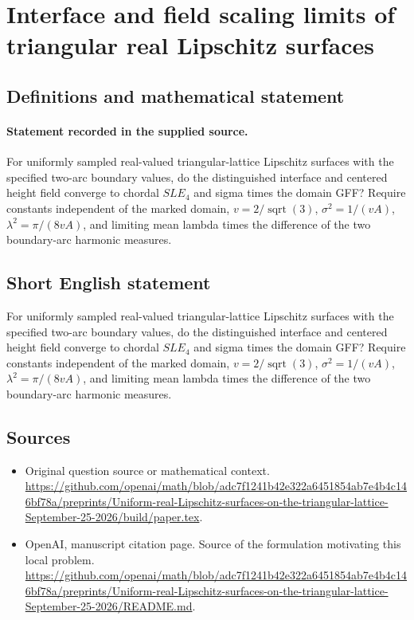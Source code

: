 \documentclass[11pt]{article}
\begin{document}
\section*{Interface and field scaling limits of triangular real Lipschitz surfaces}\label{30007386}
\subsection{Definitions and mathematical statement}
\paragraph{Statement recorded in the supplied source.}
For uniformly sampled real-valued triangular-lattice Lipschitz surfaces with the specified two-arc boundary values, do the distinguished interface and centered height field converge to chordal $SLE_4$ and sigma times the domain GFF? Require constants independent of the marked domain, $v=2/\operatorname{sqrt}(3)$, $\sigma ^2=1/(vA)$, $\lambda ^2=\pi /(8vA)$, and limiting mean lambda times the difference of the two boundary-arc harmonic measures.
\subsection{Short English statement}
For uniformly sampled real-valued triangular-lattice Lipschitz surfaces with the specified two-arc boundary values, do the distinguished interface and centered height field converge to chordal $SLE_4$ and sigma times the domain GFF? Require constants independent of the marked domain, $v=2/\operatorname{sqrt}(3)$, $\sigma ^2=1/(vA)$, $\lambda ^2=\pi /(8vA)$, and limiting mean lambda times the difference of the two boundary-arc harmonic measures.
\subsection{Sources}
\begin{itemize}
\item[S1] Original question source or mathematical context.
\url{https://github.com/openai/math/blob/adc7f1241b42e322a6451854ab7e4b4c146bf78a/preprints/Uniform-real-Lipschitz-surfaces-on-the-triangular-lattice-September-25-2026/build/paper.tex}.
\item[S2] OpenAI, manuscript citation page. Source of the formulation motivating this local problem.
\url{https://github.com/openai/math/blob/adc7f1241b42e322a6451854ab7e4b4c146bf78a/preprints/Uniform-real-Lipschitz-surfaces-on-the-triangular-lattice-September-25-2026/README.md}.
\end{itemize}
\end{document}
